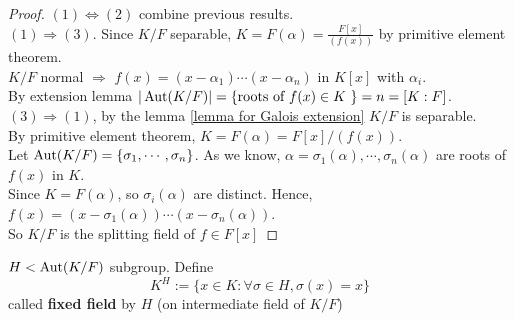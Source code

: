 \begin{proof}
     $ (1)\Leftrightarrow (2) $ combine previous results.\\
      $ (1)\Rightarrow (3) $. Since  $ K/F  $ separable,  $ K=F(\alpha)=\frac{F[x]}{(f(x))} $ by primitive element theorem. \\
     $ K/F  $ normal  $ \Rightarrow  $  $ f(x)=(x-\alpha_1)\cdots(x-\alpha_n) $ in  $ K[x] $ with  $ \alpha_i $.\\
     By extension lemma  $ |\operatorname{Aut}(K/F)|=\{\text{roots of  $ f(x) \in K $ }\}=n=[K:F] $.\\
      $ (3)\Rightarrow (1) $, by the lemma  \ref{lemma for Galois extension}  $ K/F  $ is separable.\\
      By primitive element theorem,  $ K=F(\alpha)=F[x] /(f(x))$.\\
      Let  $ \operatorname{Aut}(K/F)=\{\sigma_1,\cdots,\sigma_n\} $. As we know,  $ \alpha=\sigma_1(\alpha),\cdots,\sigma_n(\alpha) $ are roots of  $ f(x)  $ in  $ K  $.\\
      Since  $ K=F(\alpha) $, so   $ \sigma_i(\alpha) $ are distinct. Hence,   $ f(x)=(x-\sigma_1(\alpha))\cdots(x-\sigma_n(\alpha)) $.\\
      So  $ K/F  $ is the splitting field of  $ f\in F[x] $   
\end{proof}
\begin{definition}
      $ H <\operatorname{Aut}(K/F)$ subgroup. Define 
      \[K^H:=\{x\in K:\forall \sigma\in H, \sigma(x)=x\}\]
      called \textbf{fixed field} by  $ H  $ (on intermediate field of  $ K/F $)
\end{definition}